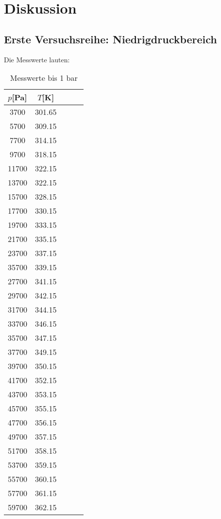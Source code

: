\section{Diskussion}
\label{sec:Diskussion}
\subsection{Erste Versuchsreihe: Niedrigdruckbereich}
Die Messwerte lauten:
\begin{table}[H]
\centering
   \caption{Messwerte bis 1 bar}
   \label{tab:data}
   \begin{tabular}{c c c c c}
   \toprule
    $p$[Pa] & $T$[K] \\
    \midrule
      3700 &   301.65 \\  
      5700 &   309.15 \\  
      7700 &   314.15 \\  
      9700 &   318.15 \\ 
      11700 &   322.15 \\ 
      13700 &   322.15 \\ 
      15700 &   328.15 \\ 
      17700 &   330.15 \\ 
      19700 &   333.15 \\ 
      21700 &   335.15 \\ 
      23700 &   337.15 \\ 
      35700 &   339.15 \\ 
      27700 &   341.15 \\ 
      29700 &   342.15 \\ 
      31700 &   344.15 \\ 
      33700 &   346.15 \\ 
      35700 &   347.15 \\ 
      37700 &   349.15 \\
      39700 &   350.15 \\ 
      41700 &   352.15 \\ 
      43700 &   353.15 \\ 
      45700 &   355.15 \\ 
      47700 &   356.15 \\ 
      49700 &   357.15 \\ 
      51700 &   358.15 \\ 
      53700 &   359.15 \\ 
      55700 &   360.15 \\ 
      57700 &   361.15 \\ 
      59700 &   362.15 \\ 

\end{tabular}
\end{table}
